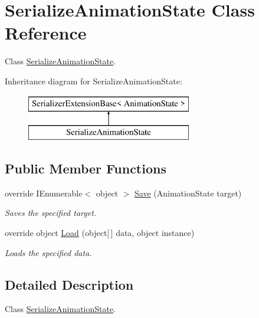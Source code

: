 \hypertarget{class_serialize_animation_state}{}\section{Serialize\+Animation\+State Class Reference}
\label{class_serialize_animation_state}


Class \hyperlink{class_serialize_animation_state}{Serialize\+Animation\+State}.  


Inheritance diagram for Serialize\+Animation\+State\+:\begin{figure}[H]
\begin{center}
\leavevmode
\includegraphics[height=2.000000cm]{class_serialize_animation_state}
\end{center}
\end{figure}
\subsection*{Public Member Functions}
\begin{DoxyCompactItemize}
\item 
override I\+Enumerable$<$ object $>$ \hyperlink{class_serialize_animation_state_a3c4bec56bc5d5363ebdcc7a85e361bca}{Save} (Animation\+State target)
\begin{DoxyCompactList}\small\item\em Saves the specified target. \end{DoxyCompactList}\item 
override object \hyperlink{class_serialize_animation_state_a2e05ae356542c8df18779774e5189cee}{Load} (object\mbox{[}$\,$\mbox{]} data, object instance)
\begin{DoxyCompactList}\small\item\em Loads the specified data. \end{DoxyCompactList}\end{DoxyCompactItemize}


\subsection{Detailed Description}
Class \hyperlink{class_serialize_animation_state}{Serialize\+Animation\+State}. 



